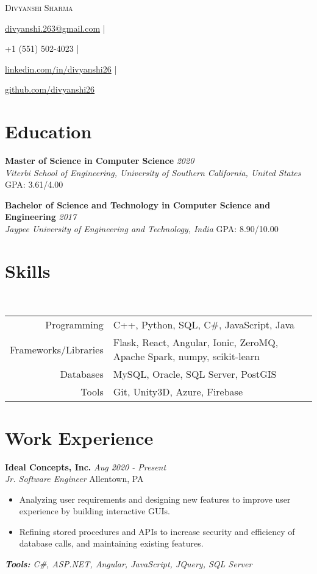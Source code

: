 \documentclass[letterpaper,10pt]{article}
\newcommand{\organization}[4]{
    \vspace{1.5pt}
    \textbf{#1} \hfill{\emph{#2}} \\
    \emph{#3} \hfill{#4} \\
    \vspace{3pt}
}
\newcommand{\toolsused}[1]{
    \vspace{1.5pt}
    \emph{#1}\\
    \vspace{3pt}
}
\newcommand{\skills}[4]{
    \vspace{-2pt}
    \ \ \ \ \ \ \ \ \ \ \ 
    \begin{tabular}{r!{\color{burgundy}\vrule}l}
          Programming & #1 \\
          Frameworks/Libraries & #2 \\
          Databases & #3 \\
          Tools & #4
    \end{tabular}
    \vspace{4pt}
}
\newcommand{\bulletsBegin}{
    \vspace{1pt}
    \begin{minipage}{17.6cm}
    \begin{itemize}[leftmargin=0.6cm]
    \setlength\itemsep{-0.1em}
}
\newcommand{\bulletsEnd}{
    \end{itemize}\vspace{0pt}
    \end{minipage}
}
\newcommand{\myEmail}[1]{
    \href{mailto:#1}{#1} |
}
\newcommand{\myPhone}[1]{
    {#1} |
}
\newcommand{\mySite}[1]{
    \href{https://linkedin.com/in/divyanshi26}{#1} |
}
\newcommand{\myGitHub}[1]{
    \href{https://github.com/divyanshi26}{#1}
}
\newcommand{\myName}[5]{
    \begin{center}
        {\huge{\color{burgundy}\scshape{#1}}} \\
        \vspace{6pt}
        \myEmail{#2}
        \myPhone{#3}
        \mySite{#4}
        \myGitHub{#5}
    \end{center}
    \vspace{-4pt}
}
\begin{document}
    \myName{Divyanshi Sharma}{divyanshi.263@gmail.com}{+1 (551) 502-4023}{linkedin.com/in/divyanshi26}{github.com/divyanshi26}

    \section{Education}
        
    \organization{Master of Science in Computer Science}{2020}
        {Viterbi School of Engineering, University of Southern California, United States}{GPA: 3.61/4.00}

	\organization{Bachelor of Science and Technology in Computer Science and Engineering}{2017}
        {Jaypee University of Engineering and Technology, India}{GPA: 8.90/10.00}
	\vspace{6pt}
    
    \section{Skills}
    
    \skills
        {C++, Python, SQL, C\#, JavaScript, Java}  %
        {Flask, React, Angular, Ionic, ZeroMQ, Apache Spark, numpy, scikit-learn}  %
        {MySQL, Oracle, SQL Server, PostGIS}  %
        {Git, Unity3D, Azure, Firebase}  %

    \section{Work Experience}
    
    	\organization{Ideal Concepts, Inc.}{Aug 2020 - Present}
        {Jr. Software Engineer}{Allentown, PA}
        \bulletsBegin
            \item Analyzing user requirements and designing new features to improve user experience by building interactive GUIs.
            \vspace{-2pt}
            \item Refining stored procedures and APIs to increase security and efficiency of database calls, and maintaining existing features.
            \vspace{-2pt}
        \bulletsEnd
        \vspace{-4pt}
        \toolsused{\textbf{Tools:} C\#, ASP.NET, Angular, JavaScript, JQuery, SQL Server}
\end{document}
